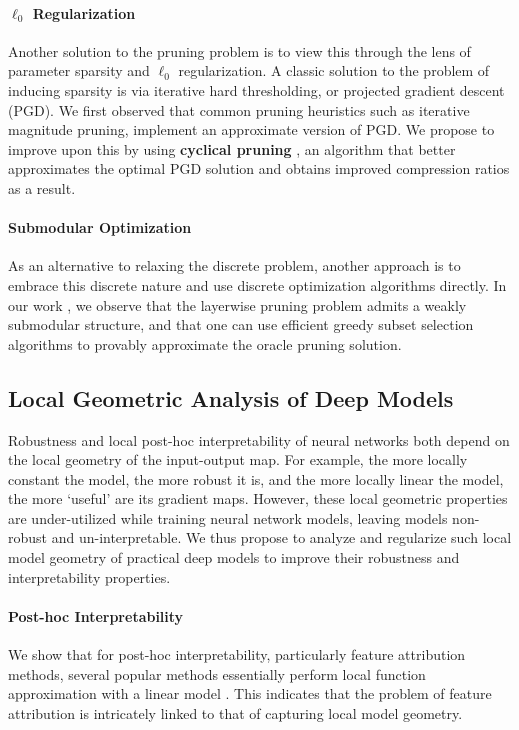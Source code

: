 \documentclass{article}
\renewcommand{\cite}{\citep}
\begin{document}
\paragraph*{$\ell_0$ Regularization} Another solution to the pruning problem is to view this through the lens of parameter sparsity and $\ell_0$ regularization. A classic solution to the problem of inducing sparsity is via iterative hard thresholding, or projected gradient descent (PGD). We first observed that common pruning heuristics such as iterative magnitude pruning, implement an approximate version of PGD. We propose to improve upon this by using \textbf{cyclical pruning} \cite{srinivas2022cyclical}, an algorithm that better approximates the optimal PGD solution and obtains improved compression ratios as a result.

\paragraph*{Submodular Optimization} As an alternative to relaxing the discrete problem, another approach is to embrace this discrete nature and use discrete optimization algorithms directly. In our work \cite{halabi2022dataefficient}, we observe that the layerwise pruning problem admits a weakly submodular structure, and that one can use efficient greedy subset selection algorithms to provably approximate the oracle pruning solution. 

\subsection*{Local Geometric Analysis of Deep Models}
Robustness and local post-hoc interpretability of neural networks both depend on the local geometry of the input-output map. For example, the more locally constant the model, the more robust it is, and the more locally linear the model, the more `useful' are its gradient maps. However, these local geometric properties are under-utilized while training neural network models, leaving models non-robust and un-interpretable. We thus propose to analyze and regularize such local model geometry of practical deep models to improve their robustness and interpretability properties. 

\paragraph*{Post-hoc Interpretability} We show that for post-hoc interpretability, particularly feature attribution methods, several popular methods essentially perform local function approximation with a linear model \cite{han2022which}. This indicates that the problem of feature attribution is intricately linked to that of capturing local model geometry.
\end{document}
